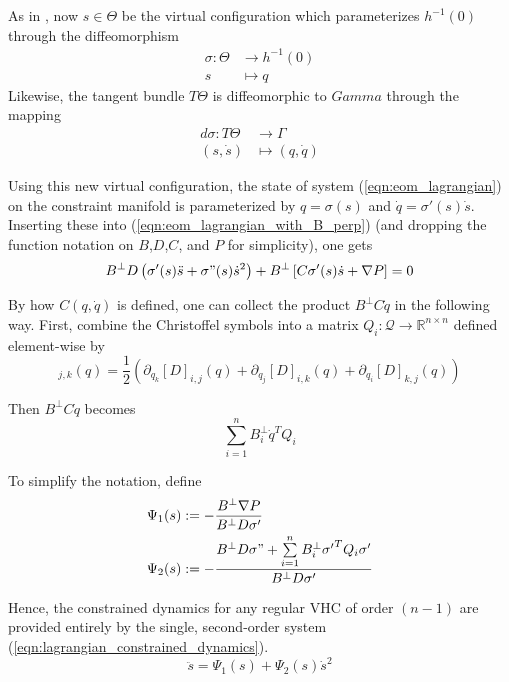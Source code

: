 As in \cite{lagrangian_structure_reduced_dynamics_vhcs}, 
now \(s \in \Theta\) be the virtual configuration which parameterizes
\(h^{-1}(0)\) through the diffeomorphism 
\begin{align*}
   \sigma : \Theta &\rightarrow h^{-1}(0) \\
   s &\mapsto q
\end{align*}
Likewise, the tangent bundle \(T\Theta\) is diffeomorphic to \(Gamma\) 
through the mapping
\begin{align*}
   d\sigma : T\Theta &\rightarrow \Gamma \\
   (s,\dot{s}) &\mapsto (q,\dot{q})
\end{align*}

Using this new virtual configuration, the state of system
(\ref{eqn:eom_lagrangian}) on the constraint manifold
is parameterized by \(q = \sigma(s)\) and \(\dot{q} = \sigma'(s)\dot{s}\).
Inserting these into (\ref{eqn:eom_lagrangian_with_B_perp}) (and dropping the
function notation on \(B\),\(D\),\(C\), and \(P\) for simplicity), one gets
\begin{align*}
   B^\perp D\left(\sigma'(s)\ddot{s} + \sigma"(s)\dot{s}^2 \right)
   + B^\perp \left[ C \sigma'(s)\dot{s} + \nabla P \right] = 0
\end{align*}

By how \(C(q,\dot{q})\) is defined, 
one can collect the product \(B^\perp C \dot{q}\) in the following way.
First, combine the Christoffel symbols  into a matrix
\(Q_i : \mathcal{Q} \rightarrow \mathbb{R}^{n \times n}\)
defined element-wise by
\begin{equation*}
   [Q_i]_{j,k}(q) = \frac{1}{2}\left(\partial_{q_k} [D]_{i,j}(q)
      + \partial_{q_j} [D]_{i,k}(q) 
      + \partial_{q_i} [D]_{k,j}(q)\right)
\end{equation*}

Then \(B^\perp C \dot{q}\) becomes
\begin{equation*}
   \sum \limits_{i=1}^n B_i^\perp \dot{q}^T Q_i
\end{equation*}

To simplify the notation, define 
\begin{align*}
   \Psi_1(s) &:= -\frac{B^\perp \nabla P}{B^\perp D \sigma'} \\
   \Psi_2(s) &:= -\frac{B^\perp D \sigma" + \sum\limits_{i=1}^n B_i^\perp
   {\sigma'}^T Q_i \sigma'}{B^\perp D \sigma'} 
\end{align*}

Hence, the constrained dynamics for any regular VHC of order \((n-1)\) are
provided entirely by the single, second-order system 
(\ref{eqn:lagrangian_constrained_dynamics}).
\begin{equation}\label{eqn:lagrangian_constrained_dynamics}
   \ddot{s} = \Psi_1(s) + \Psi_2(s)\dot{s}^2
\end{equation}


